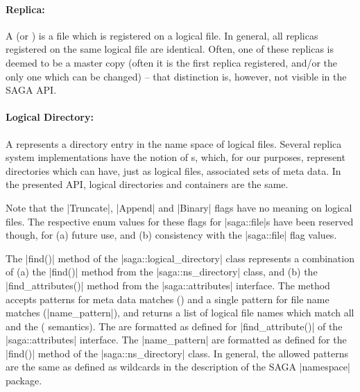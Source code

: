     \paragraph{Replica:} A  (or ) is
    a file which is registered on a logical file.  In general,
    all replicas registered on the same logical file are
    identical.  Often, one of these replicas is deemed to be a
    master copy (often it is the first replica
    registered, and/or the only one which can be changed) --
    that distinction is, however, not visible in the SAGA API.
 
    \paragraph{Logical Directory:} A 
    represents a directory entry in the name space of logical
    files.  Several replica system implementations have the
    notion of s, which, for our purposes, represent
    directories which can have, just as logical files,
    associated sets of meta data.  In the presented API, logical
    directories and containers are the same.
 
 
    Note that the |Truncate|, |Append| and |Binary| flags have no
    meaning on logical files.  The respective enum values for these
    flags for |saga::file|s have been reserved though, for (a) future
    use, and (b) consistency with the |saga::file| flag values.
 
    The |find()| method of the |saga::logical_directory| class
    represents a combination of (a) the |find()| method from the
    |saga::ns_directory| class, and (b) the |find_attributes()|
    method from the |saga::attributes| interface.  The method
    accepts patterns for meta data matches
    () and a single pattern for file
    name matches (|name_pattern|), and returns a list of logical
    file names which match
    all  and the  (
    semantics).  The  are formatted as
    defined for |find_attribute()| of the |saga::attributes|
    interface.  The |name_pattern| are formatted as defined for
    the |find()| method of the |saga::ns_directory| class.  In
    general, the allowed patterns are the same as defined as
    wildcards in the description of the SAGA
    |namespace| package.
 
